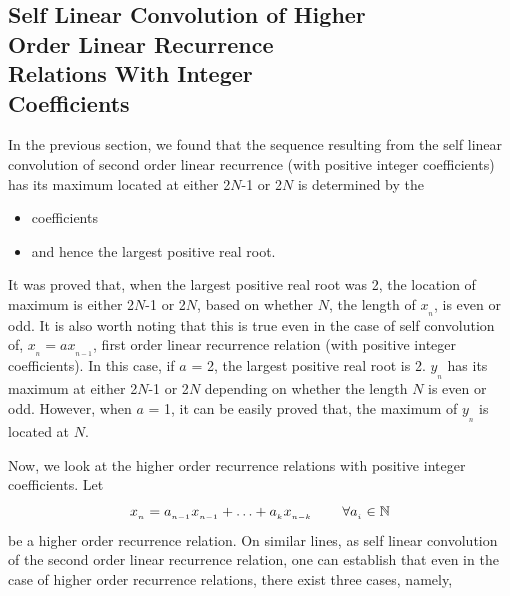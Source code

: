 \begin{multicols}{2}
\section{Self Linear Convolution of Higher\\ Order Linear Recurrence\\ Relations With Integer\\ Coefficients}\label{section-19}

In the previous section, we found that the sequence resulting from the self linear convolution of second order linear recurrence (with positive integer coefficients) has its maximum located at either 2$N$-1 or 2$N$ is determined by the

\vspace{-.3cm}

\begin{itemize} 
 \setlength{\parskip}{0pt}
\item coefficients
\item and hence the largest positive real root. 
\end{itemize}

\vspace{-.3cm}

It was proved that, when the largest positive real root was 2, the location of maximum is either 2$N$-1 or 2$N$, based on whether $N$, the length of $x_{_n}$, is even or odd.
 It is also worth noting that this is true even in the case of self convolution of, $x_{_n} = a x_{_{n-1}}$, first order linear recurrence relation (with positive integer coefficients). In this case, if $a$ = 2, the largest positive real root is 2.  $y_{_n}$ has its maximum at either 2$N$-1 or 2$N$ depending on whether the length $N$ is even or odd.  However, when $a$ = 1, it can be easily proved that, the maximum of $y_{_n}$ is located at $N$. 
 
Now, we look at the higher order recurrence relations with positive integer coefficients. Let 
\begin{equation}
 x_{_n} = a_{_{n-1}}x_{_{n-1}} + \ldots + a_{_k}x_{_{n-k}} \hspace{0.3in} \forall a_{_i} \in \mathbb{N}\label{eq-19.1}
\end{equation}
be a higher order recurrence relation. On similar lines, as self linear convolution of the second order linear recurrence relation, one can establish that even in the case of higher order recurrence relations, there exist three cases, namely,

\vspace{-.3cm}


\end{multicols}
